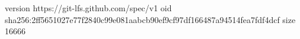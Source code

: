 version https://git-lfs.github.com/spec/v1
oid sha256:2ff5651027e77f2840c99e081aabcb90ef9cf97df166487a94514fea7fdf4dcf
size 16666

